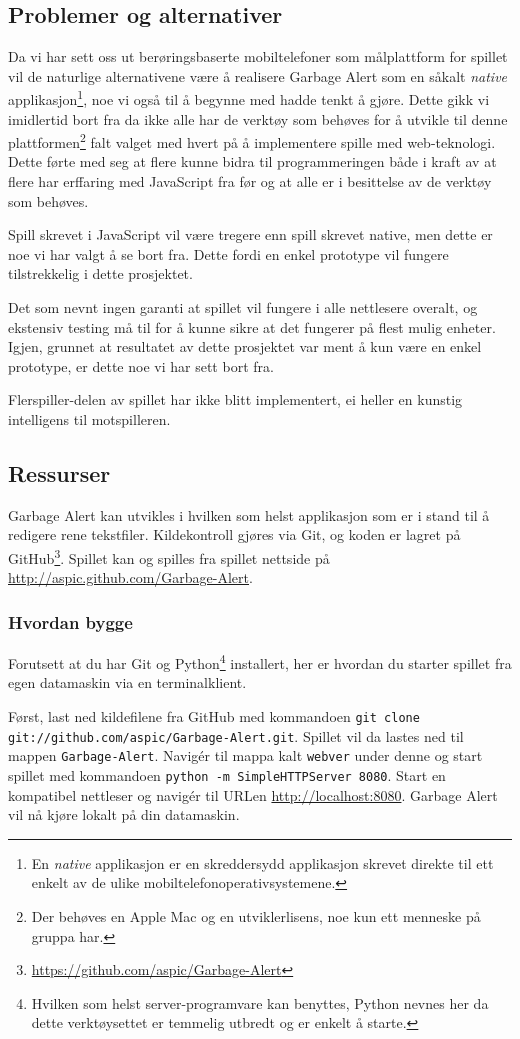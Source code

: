 \subsection{Problemer og alternativer}
Da vi har sett oss ut berøringsbaserte mobiltelefoner som målplattform for spillet vil de naturlige alternativene være å realisere Garbage Alert som en såkalt \emph{native} applikasjon\footnote{En \emph{native} applikasjon er en skreddersydd applikasjon skrevet direkte til ett enkelt av de ulike mobiltelefonoperativsystemene.}, noe vi også til å begynne med hadde tenkt å gjøre. Dette gikk vi imidlertid bort fra da ikke alle har de verktøy som behøves for å utvikle til denne plattformen\footnote{Der behøves en Apple Mac og en utviklerlisens, noe kun ett menneske på gruppa har.} falt valget med hvert på å implementere spille med web-teknologi. Dette førte med seg at flere kunne bidra til programmeringen både i kraft av at flere har erffaring med JavaScript fra før og at alle er i besittelse av de verktøy som behøves.

Spill skrevet i JavaScript vil være tregere enn spill skrevet native, men dette er noe vi har valgt å se bort fra. Dette fordi en enkel prototype vil fungere tilstrekkelig i dette prosjektet.

Det som nevnt ingen garanti at spillet vil fungere i alle nettlesere overalt, og ekstensiv testing må til for å kunne sikre at det fungerer på flest mulig enheter. Igjen, grunnet at resultatet av dette prosjektet var ment å kun være en enkel prototype, er dette noe vi har sett bort fra.

Flerspiller-delen av spillet har ikke blitt implementert, ei heller en kunstig intelligens til motspilleren.


\subsection{Ressurser}
Garbage Alert kan utvikles i hvilken som helst applikasjon som er i stand til å redigere rene tekstfiler. Kildekontroll gjøres via Git, og koden er lagret på GitHub\footnote{\url{https://github.com/aspic/Garbage-Alert}}. Spillet kan og spilles fra spillet nettside på \url{http://aspic.github.com/Garbage-Alert}.

\subsubsection*{Hvordan bygge}
Forutsett at du har Git og Python\footnote{Hvilken som helst server-programvare kan benyttes, Python nevnes her da dette verktøysettet er temmelig utbredt og er enkelt å starte.} installert, her er hvordan du starter spillet fra egen datamaskin via en terminalklient.

Først, last ned kildefilene fra GitHub med kommandoen \newline\texttt{git clone git://github.com/aspic/Garbage-Alert.git}. Spillet vil da lastes ned til mappen \texttt{Garbage-Alert}. Navigér til mappa kalt \texttt{webver} under denne  og start spillet med kommandoen \texttt{python -m SimpleHTTPServer 8080}. Start en kompatibel nettleser og navigér til URLen \url{http://localhost:8080}. Garbage Alert vil nå kjøre lokalt på din datamaskin.
